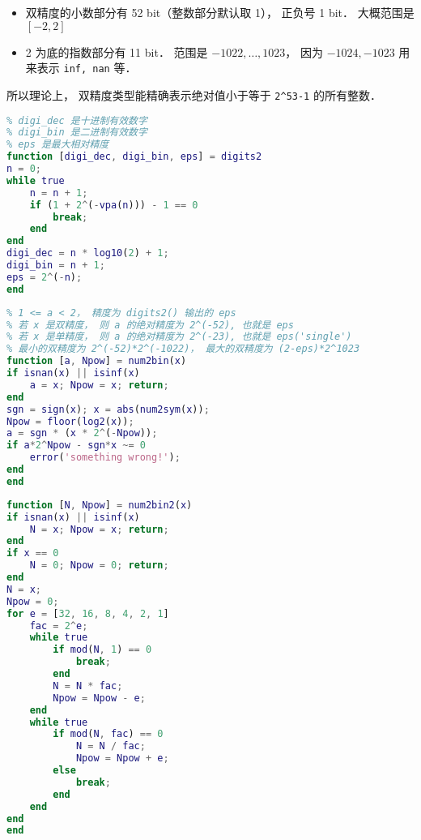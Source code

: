 
\begin{issues}
\issueDraft
\end{issues}


\begin{itemize}
\item 双精度的小数部分有 52 bit（整数部分默认取 1）， 正负号 1 bit． 大概范围是 $[-2,2]$
\item 2 为底的指数部分有 11 bit． 范围是 $-1022,\dots,1023$， 因为 $-1024, -1023$ 用来表示 \verb|inf, nan| 等．
\end{itemize}

所以理论上， 双精度类型能精确表示绝对值小于等于 \verb|2^53-1| 的所有整数．

\begin{lstlisting}[language=matlab, caption=digits2.m]
% 求当前 vpa 变精度计算的有效数字
% digi_dec 是十进制有效数字
% digi_bin 是二进制有效数字
% eps 是最大相对精度
function [digi_dec, digi_bin, eps] = digits2
n = 0;
while true
    n = n + 1;
    if (1 + 2^(-vpa(n))) - 1 == 0
        break;
    end
end
digi_dec = n * log10(2) + 1;
digi_bin = n + 1;
eps = 2^(-n);
end
\end{lstlisting}

\begin{lstlisting}[language=matlab, caption=num2bin.m]
% x = a*2^Npw (exactly)
% 1 <= a < 2， 精度为 digits2() 输出的 eps
% 若 x 是双精度， 则 a 的绝对精度为 2^(-52), 也就是 eps
% 若 x 是单精度， 则 a 的绝对精度为 2^(-23), 也就是 eps('single')
% 最小的双精度为 2^(-52)*2^(-1022)， 最大的双精度为 (2-eps)*2^1023
function [a, Npow] = num2bin(x)
if isnan(x) || isinf(x)
    a = x; Npow = x; return;
end
sgn = sign(x); x = abs(num2sym(x));
Npow = floor(log2(x));
a = sgn * (x * 2^(-Npow));
if a*2^Npow - sgn*x ~= 0
    error('something wrong!');
end
end
\end{lstlisting}

\begin{lstlisting}[language=matlab, caption=num2bin2.m]
% 精确解出 x = N*2^Npow， 其中 N 是奇数和整数, Npow 是整数
function [N, Npow] = num2bin2(x)
if isnan(x) || isinf(x)
    N = x; Npow = x; return;
end
if x == 0
    N = 0; Npow = 0; return;
end
N = x;
Npow = 0;
for e = [32, 16, 8, 4, 2, 1]
    fac = 2^e;
    while true
        if mod(N, 1) == 0
            break;
        end
        N = N * fac;
        Npow = Npow - e;
    end
    while true
        if mod(N, fac) == 0
            N = N / fac;
            Npow = Npow + e;
        else
            break;
        end
    end
end
end
\end{lstlisting}

